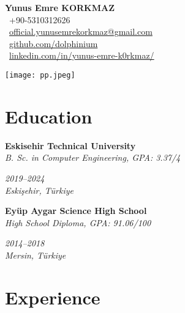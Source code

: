 \documentclass[10pt, a4paper]{article}
\newcommand{\cvitem}[4]{%
  \par\needspace{3\baselineskip}%
  \noindent%
  \begin{minipage}[t]{\dimexpr\linewidth-12em}%
    \textbf{#1} \\%
    \textit{#3} %
  \end{minipage}%
  \hfill%
  \begin{minipage}[t]{14em}%
    \raggedleft%
    \textit{#2} \\%
    \textit{#4} %
  \end{minipage}%
  \par %
}
\begin{document}
\begin{minipage}[t]{0.75\textwidth} %
    \vspace{0pt} %
    {\LARGE\bfseries Yunus Emre KORKMAZ} \\[8pt] %
    {\large %
        \faPhone\ +90-5310312626 \\[\smallskipamount] %
        \faEnvelope\ \href{mailto:official.yunusemrekorkmaz@gmail.com}{official.yunusemrekorkmaz@gmail.com} \\[\smallskipamount] %
        \faGithub\ \href{https://github.com/dolphinium}{github.com/dolphinium} \\[\smallskipamount] %
        \faLinkedin\ \href{https://www.linkedin.com/in/yunus-emre-k0rkmaz/}{linkedin.com/in/yunus-emre-k0rkmaz/} %
    }
\end{minipage}%
\hfill %
\begin{minipage}[t]{0.2\textwidth} %
    \vspace{0pt} %
    \flushright %
    \vspace{-16pt} %
    \texttt{[image: pp.jpeg]} %
\end{minipage}

\vspace{-1.0cm} %

\section{Education}

\cvitem{Eskisehir Technical University}{2019--2024}
       {B. Sc. in Computer Engineering, GPA: 3.37/4}{Eskişehir, Türkiye}

\cvitem{Eyüp Aygar Science High School}{2014--2018}
       {High School Diploma, GPA: 91.06/100}{Mersin, Türkiye}

\section{Experience}
\end{document}
